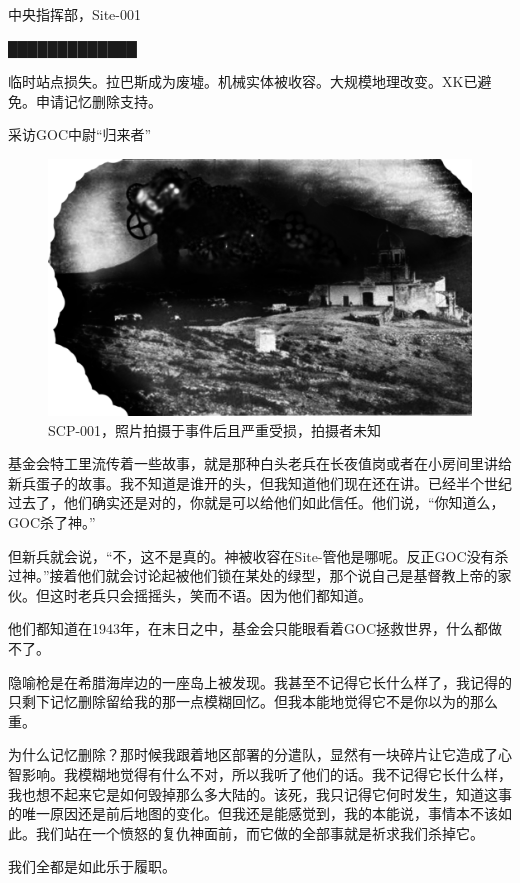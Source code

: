\begin{scpbox}

中央指挥部，Site-001

█████████████

临时站点损失。拉巴斯成为废墟。机械实体被收容。大规模地理改变。XK已避免。申请记忆删除支持。

\end{scpbox}

采访GOC中尉“归来者” \\

\begin{figure}[H]
	\centering
	\includegraphics[width=0.5\linewidth]{images/SCP-001-the-broken-god-6.png}
	\caption*{SCP-001，照片拍摄于事件后且严重受损，拍摄者未知}
\end{figure}

\begin{scpbox}

基金会特工里流传着一些故事，就是那种白头老兵在长夜值岗或者在小房间里讲给新兵蛋子的故事。我不知道是谁开的头，但我知道他们现在还在讲。已经半个世纪过去了，他们确实还是对的，你就是可以给他们如此信任。他们说，“你知道么，GOC杀了神。”

但新兵就会说，“不，这不是真的。神被收容在Site-管他是哪呢。反正GOC没有杀过神。”接着他们就会讨论起被他们锁在某处的绿型，那个说自己是基督教上帝的家伙。但这时老兵只会摇摇头，笑而不语。因为他们都知道。

他们都知道在1943年，在末日之中，基金会只能眼看着GOC拯救世界，什么都做不了。

隐喻枪是在希腊海岸边的一座岛上被发现。我甚至不记得它长什么样了，我记得的只剩下记忆删除留给我的那一点模糊回忆。但我本能地觉得它不是你以为的那么重。

为什么记忆删除？那时候我跟着地区部署的分遣队，显然有一块碎片让它造成了心智影响。我模糊地觉得有什么不对，所以我听了他们的话。我不记得它长什么样，我也想不起来它是如何毁掉那么多大陆的。该死，我只记得它何时发生，知道这事的唯一原因还是前后地图的变化。但我还是能感觉到，我的本能说，事情本不该如此。我们站在一个愤怒的复仇神面前，而它做的全部事就是祈求我们杀掉它。

我们全都是如此乐于履职。

\end{scpbox}

